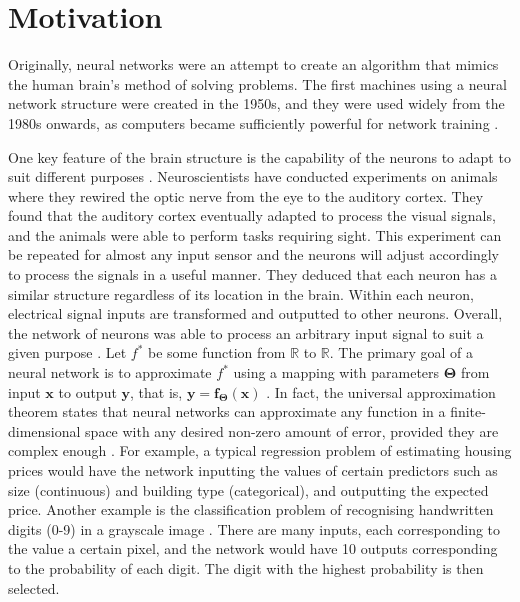 \documentclass[honours,12pt, twoside]{unswthesis}
\newcommand{\R}{\mathbb{R}}
\numberwithin{equation}{section}
\theoremstyle{definition}
\begin{document}
\section{Motivation}\label{sec:2.1}
Originally, neural networks were an attempt to create an algorithm that mimics the human brain's method of solving problems. The first machines using a neural network structure were created in the 1950s, and they were used widely from the 1980s onwards, as computers became sufficiently powerful for network training \citep{DeepLearning}.

One key feature of the brain structure is the capability of the neurons to adapt to suit different purposes \citep{neuroplast}. Neuroscientists have conducted experiments on animals where they rewired the optic nerve from the eye to the auditory cortex. They found that the auditory cortex eventually adapted to process the visual signals, and the animals were able to perform tasks requiring sight. This experiment can be repeated for almost any input sensor and the neurons will adjust accordingly to process the signals in a useful manner. They deduced that each neuron has a similar structure regardless of its location in the brain. Within each neuron, electrical signal inputs are transformed and outputted to other neurons. Overall, the network of neurons was able to process an arbitrary input signal to suit a given purpose \citep{neuroplast}.
\newpage
Let $f^*$ be some function from $\R$ to $\R$. The primary goal of a neural network is to approximate $f^*$ using a mapping with parameters $\bm{\Theta}$ from input $\bm{x}$ to output $\bm{y}$, that is, $\bm{y}=\bm{f}_{\bm{\Theta}}(\bm{x})$ \citep{DeepLearning}. In fact, the universal approximation theorem states that neural networks can approximate any function in a finite-dimensional space with any desired non-zero amount of error, provided they are complex enough \citep{universal, cybenko}. For example, a typical regression problem of estimating housing prices would have the network inputting the values of certain predictors such as size (continuous) and building type (categorical), and outputting the expected price. Another example is the classification problem of recognising handwritten digits (0-9) in a grayscale image \citep{mnist}. There are many inputs, each corresponding to the value a certain pixel, and the network would have 10 outputs corresponding to the probability of each digit. The digit with the highest probability is then selected.
\end{document}
